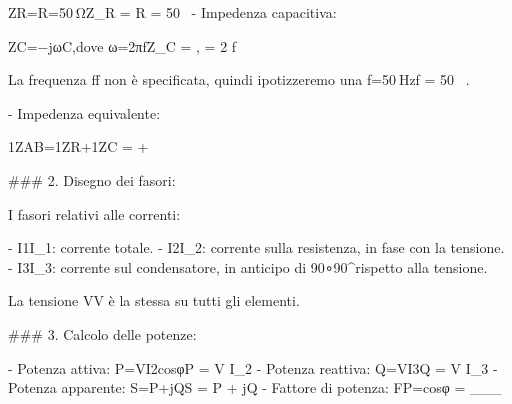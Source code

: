     ZR=R=50 ΩZ_R = R = 50 \, \Omega
-   Impedenza capacitiva:

    ZC=−jωC,dove ω=2πfZ_C = , \quad {} \omega = 2 \pi f

    La frequenza ff non è specificata, quindi ipotizzeremo una f=50 Hzf = 50 \, .

-   Impedenza equivalente:

    1ZAB=1ZR+1ZC =  + 

### 2. Disegno dei fasori:

I fasori relativi alle correnti:

-   I1I_1: corrente totale.
-   I2I_2: corrente sulla resistenza, in fase con la tensione.
-   I3I_3: corrente sul condensatore, in anticipo di 90∘90^\circ rispetto alla tensione.

La tensione VV è la stessa su tutti gli elementi.

### 3. Calcolo delle potenze:

-   Potenza attiva: P=VI2cos⁡φP = V I_2 \cos\varphi
-   Potenza reattiva: Q=VI3Q = V I_3
-   Potenza apparente: S=P+jQS = P + jQ
-   Fattore di potenza: FP=cos⁡φ = \cos\varphi
___
